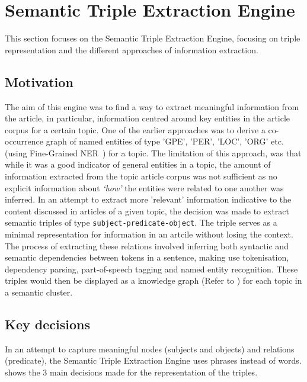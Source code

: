 \chapter{Semantic Triple Extraction Engine}

\vspace{-2ex}
This section focuses on the Semantic Triple Extraction Engine, focusing on triple representation and the different approaches of information extraction.

\section{Motivation}
The aim of this engine was to find a way to extract meaningful information from the article, in particular, information centred around key entities in the article corpus for a certain topic. One of the earlier approaches was to derive a co-occurrence graph of named entities of type 'GPE', 'PER', 'LOC', 'ORG' etc. (using Fine-Grained NER~) for a topic. The limitation of this approach, was that while it was a good indicator of general entities in a topic, the amount of information extracted from the topic article corpus was not sufficient as no explicit information about \textit{`how'} the entities were related to one another was inferred. In an attempt to extract more 'relevant' information indicative to the content discussed in articles of a given topic, the decision was made to extract semantic triples of type \texttt{subject-predicate-object}. The triple serves as a minimal representation for information in an artcile without losing the context. The process of extracting these relations involved inferring both syntactic and semantic dependencies between tokens in a sentence, making use tokenisation, dependency parsing,  part-of-speech tagging and named entity recognition. These triples would then be displayed as a knowledge graph (Refer to ) for each topic in a semantic cluster.

\section{Key decisions} \label{key_decisions_rel}

In an attempt to capture meaningful nodes (subjects and objects) and relations (predicate), the Semantic Triple Extraction Engine uses phrases instead of words.  shows the 3 main decisions made for the representation of the triples. 

